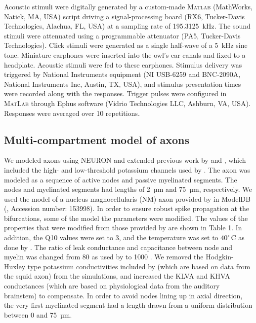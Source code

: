 \documentclass[]{elife}
\begin{document}
Acoustic stimuli were digitally generated by a custom-made
\textsc{Matlab} (MathWorks, Natick, MA, USA) script driving a
signal-processing board (RX6, Tucker-Davis Technologies, Alachua, FL,
USA) at a sampling rate of 195.3125~kHz. The sound stimuli were
attenuated using a programmable attenuator (PA5, Tucker-Davis
Technologies). Click stimuli were generated as a single half-wave of a
5~kHz sine tone. Miniature earphones were inserted into the owl's ear
canals and fixed to a headplate. Acoustic stimuli were fed to these
earphones. Stimulus delivery was triggered by National Instruments
equipment (NI USB-6259 and BNC-2090A, National Instruments Inc, Austin,
TX, USA), and stimulus presentation times were recorded along with the
responses. Trigger pulses were configured in \textsc{MatLab} through
Ephus software (Vidrio Technologies LLC, Ashburn, VA, USA). Responses
were averaged over 10 repetitions.

\subsection{Multi-compartment model of
axons}\label{multi-compartment-model-of-axons}

We modeled axons using NEURON \citep{Hines1997NEURON, Hines2009NEURON}
and extended previous work by \citet{Simon1999Dendritic} and
\citet{Kuba2009Roles}, which included the high- and low-threshold
potassium channels used by \citet{Rathouz1998Characterization}. The axon
was modeled as a sequence of active nodes and passive myelinated
segments. The nodes and myelinated segments had lengths of 2~µm and
75~µm, respectively. We used the model of a nucleus magnocellularis (NM)
axon provided by \citet{Simon1999Dendritic} in ModelDB
(\citet{Hines2004ModelDB}, Accession number: 153998). In order to ensure
robust spike propagation at the bifurcations, some of the model the
parameters were modified. The values of the properties that were
modified from those provided by \citet{Simon1999Dendritic} are shown in
Table 1. In addition, the Q10 values were set to 3, and the temperature
was set to \(40^{\circ}\,\text{C}\) as done by \citet{Kuba2009Roles}. The
ratio of leak conductance and capacitance between node and myelin was
changed from 80 as used by \citet{Simon1999Dendritic} to 1000
\citep{Koch2004Biophysics}. We removed the Hodgkin-Huxley type potassium
conductivities included by \citet{Simon1999Dendritic} (which are based
on data from the squid axon) from the simulations, and increased the
KLVA and KHVA conductances (which are based on physiological data from
the auditory brainstem) to compensate. In order to avoid nodes lining up
in axial direction, the very first myelinated segment had a length drawn
from a uniform distribution between 0 and 75~µm.
\end{document}
